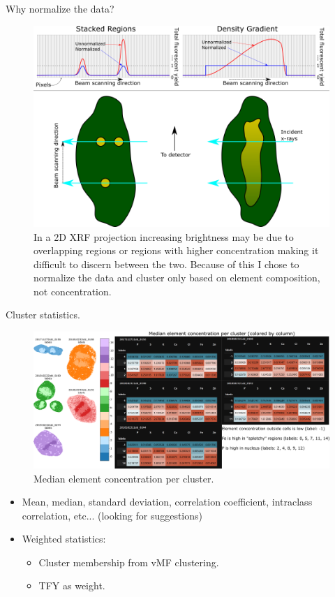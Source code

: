 \documentclass[
]{beamer}
\begin{document}
\begin{frame}{Why normalize the data?}
\begin{figure}[h]
  \includegraphics[width=1\textwidth,height=.5\textheight,keepaspectratio]{Normalization.png}
  \caption{In a 2D XRF projection increasing brightness may be due to overlapping regions or regions with higher concentration making it difficult to discern between the two. Because of this I chose to normalize the data and cluster only based on element composition, not concentration.}
\end{figure}
\end{frame}

\begin{frame}{Cluster statistics.}
\begin{figure}[h]
  \includegraphics[width=1\textwidth,height=.5\textheight,keepaspectratio]{Cluster_median.png}
  \caption{Median element concentration per cluster.}
\end{figure}
\begin{itemize}
\item Mean, median, standard deviation, correlation coefficient, intraclass correlation, etc... (looking for suggestions)
\item Weighted statistics:
\begin{itemize}
	\item Cluster membership from vMF clustering.
    \item TFY as weight.
\end{itemize}
\end{itemize}
\end{frame}
\end{document}

